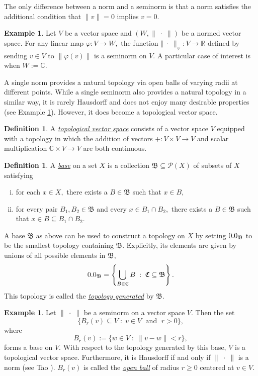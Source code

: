 \documentclass[12pt]{article}
\edef\t{\pgfmathresult}%
\theoremstyle{theorem}
\theoremstyle{definition}
\newtheorem{definition}[equation]{Definition}
\newtheorem{example}[equation]{Example}
\numberwithin{equation}{section}
\let\C=\Chi \let\W=\Omega
\def\vf{\varphi}
\newcommand{\be}{\begin{equation}}
\newcommand{\ee}{\end{equation}}
\newcommand{\bx}{\begin{example}}
\newcommand{\ex}{\end{example}}
\newcommand{\bd}{\begin{definition}}
\newcommand{\ed}{\end{definition}}
\newcommand{\<}{\langle}
\renewcommand{\>}{\rangle}
\def\R{{{\mathbb R}}}
\def\C{{{\mathbb C}}}
\begin{document}
The only difference between a norm and a seminorm is that
a norm satisfies the additional condition that $\lVert v\rVert=0$
implies $v=0.$ 

\bx
Let $V$ be a vector space and $(W,\lVert\;\cdot\;\rVert)$ be a normed
vector space. For any linear map $\vf:V\to W,$ the function
$\Vert\;\cdot\;\rVert_{\vf}:V\to\R$ defined by sending $v\in V$
to $\big\lVert\vf(v)\big\rVert$ is a seminorm on $V.$ 
A particular case of interest is when $W:=\C.$ 
\ex

A single norm provides a natural topology via
open balls of varying radii at different points. 
While a single seminorm also provides a natural topology
in a similar way, it is rarely Hausdorff and does not enjoy
many desirable properties (see Example \ref{ex:openballs}). 
However, it does become a topological
vector space. 

\bd
A \emph{\uline{topological vector space}} consists of a vector
space $V$ equipped with a topology in which 
the addition of vectors $+:V\times V\to V$ and 
scalar multiplication $\C\times V\to V$ are both continuous. 
\ed

\bd
\label{defn:basefortopology}
A \emph{\uline{base}} on a set $X$ is
a collection $\mathfrak{B}\subseteq\mathcal{P}(X)$ of
subsets of $X$ satisfying
\begin{enumerate}[i.]
\setlength{\itemsep}{0pt}
\item
for each $x\in X,$ there exists a
$B\in\mathfrak{B}$ such that $x\in B,$
\item
for every pair $B_{1},B_{2}\in\mathfrak{B}$ and
every $x\in B_{1}\cap B_{2},$ there exists
a $B\in\mathfrak{B}$ such that 
$x\in B\subseteq B_{1}\cap B_{2}.$
\end{enumerate}
A base $\mathfrak{B}$ as above
can be used to construct a topology
on $X$ by setting $\t_{\mathfrak{B}}$ to be the smallest
topology containing $\mathfrak{B}.$ Explicitly, its elements
are given by unions of all possible elements in $\mathfrak{B},$
\be
\t_{\mathfrak{B}}=\left\{ \bigcup_{B\in\mathfrak{C}} B \;:\; \mathfrak{C}\subseteq\mathfrak{B}\right\}.
\ee
This topology is called the
\emph{\uline{topology generated}} by $\mathfrak{B}.$
\ed

\bx
\label{ex:openballs}
Let $\lVert\;\cdot\;\rVert$ be a seminorm on a vector space
$V.$ Then the set
\be
\Big\{B_{r}(v)\subseteq V\;:\;v\in V\;\text{ and }\; r>0\Big\}, 
\ee
where
\be
B_{r}(v):=\big\{w\in V\;:\;\lVert v-w\rVert<r\big\},
\ee
forms a base on $V.$ With respect to the topology generated by this base, $V$ is a 
topological vector space. Furthermore, it is Hausdorff if and only if
$\lVert\;\cdot\;\rVert$ is a norm (see Tao \cite{Ta09_245B11}).
$B_{r}(v)$ is called the \emph{\uline{open ball}} of radius $r\ge0$ 
centered at $v\in V.$
\ex
\end{document}
